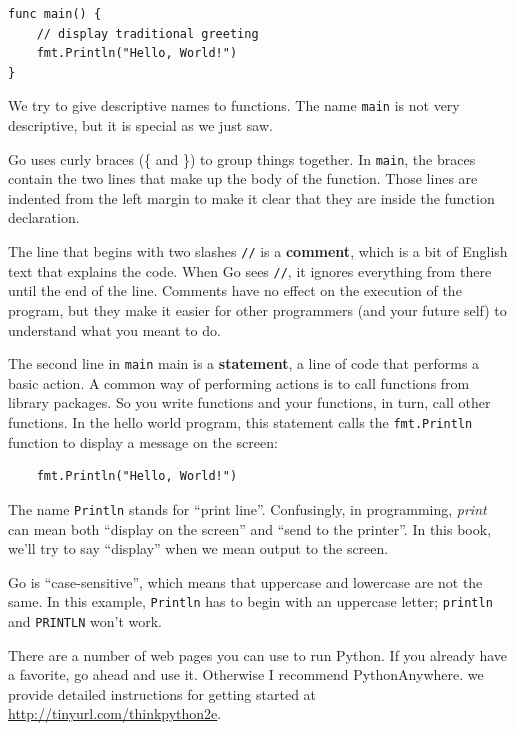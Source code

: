 \begin{lstlisting}
func main() {
	// display traditional greeting
	fmt.Println("Hello, World!")
}
\end{lstlisting}


We try to give descriptive names to functions. The name {\tt main} is not very
descriptive, but it is special as we just saw.


Go uses curly braces (\{ and \}) to group things together. In {\tt main}, the
braces contain the two lines that make up the body of the function. Those
lines are indented from the left margin to make it clear that they are inside
the function declaration.


The line that begins with two slashes {\tt //} is a {\bf comment}, which is a
bit of English text that explains the code. When Go sees {\tt //}, it ignores
everything from there until the end of the line. Comments have no effect on
the execution of the program, but they make it easier for other programmers
(and your future self) to understand what you meant to do.

The second line in {\tt main} main is a {\bf statement}, a line of code that
performs a basic action. A common way of performing actions is to call
functions from library packages. So you write functions and your functions, in
turn, call other functions. In the hello world program, this statement calls
the {\tt fmt.Println} function to display a message on the screen:

\begin{lstlisting}
	fmt.Println("Hello, World!")
\end{lstlisting}

The name {\tt Println} stands for ``print line''. Confusingly, in programming,
{\em print} can mean both ``display on the screen'' and ``send to the
printer''. In this book, we'll try to say ``display'' when we mean output to
the screen.

 Go is ``case-sensitive'', which means that uppercase
and lowercase are not the same. In this example, {\tt Println} has to begin
with an uppercase letter; {\tt println} and {\tt PRINTLN} won't work.



There are a number of web pages you can use to run Python. If you
already have a favorite, go ahead and use it. Otherwise I recommend
PythonAnywhere. we provide detailed instructions for getting started
at \url{http://tinyurl.com/thinkpython2e}. 

